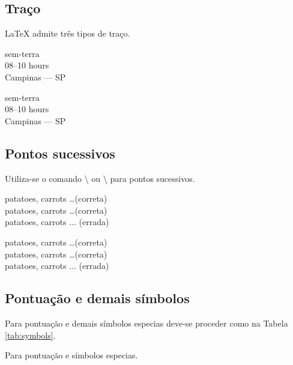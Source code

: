 \subsection{Traço}
LaTeX admite três tipos de traço. \\
\begin{minipage}[t]{0.47\linewidth} \vspace{-8pt}
    \begin{latexcode}
        sem-terra \\
        08--10 hours \\
        Campinas --- SP
    \end{latexcode}
\end{minipage} \hfill
\begin{minipage}[t]{0.47\linewidth} \vspace{0pt}
    sem-terra \\
    08--10 hours \\
    Campinas --- SP
\end{minipage}

\subsection{Pontos sucessivos}
Utiliza-se o comando \textbackslash{} ou \textbackslash{} para pontos sucessivos. \\
\begin{minipage}[t]{0.47\linewidth} \vspace{-8pt}
    \begin{latexcode}
        patatoes, carrots \ldots (correta) \\
        patatoes, carrots \dots (correta) \\
        patatoes, carrots ... (errada) \\
    \end{latexcode}
\end{minipage} \hfill
\begin{minipage}[t]{0.47\linewidth} \vspace{0pt}
    patatoes, carrots \ldots (correta) \\
    patatoes, carrots \dots (correta) \\
    patatoes, carrots ... (errada) \\
\end{minipage}

\subsection{Pontuação e demais símbolos}
Para pontuação e demais símbolos especias deve-se proceder como na Tabela \ref{tab:symbols}.
\begin{table}[h!tb]
    \centering
    \caption{Para pontuação e símbolos especias.}
    \label{tab:symbols}
    
\end{table}

